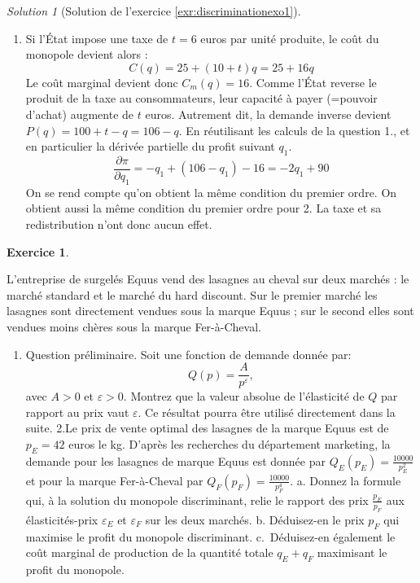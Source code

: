 \documentclass[
]{book}
\providecommand{\tightlist}{%
  \setlength{\itemsep}{0pt}\setlength{\parskip}{0pt}}
\theoremstyle{definition}
\theoremstyle{definition}
\theoremstyle{definition}
\newtheorem{exercise}{Exercice}[chapter]
\theoremstyle{definition}
\theoremstyle{remark}
\newtheorem*{solution}{Solution}
\begin{document}
\begin{solution}[Solution de l'exercice \ref{exr:discriminationexo1}]
\begin{enumerate}
\def\labelenumi{\arabic{enumi}.}
\setcounter{enumi}{2}
\tightlist
\item
  Si l'État impose une taxe de \(t=6\) euros par unité produite, le coût du monopole devient alors :
  \[C(q)=25+(10+t)q=25+16q\]
  Le coût marginal devient donc \(C_m(q)=16\).
  Comme l'État reverse le produit de la taxe au consommateurs, leur capacité à payer (=pouvoir d'achat) augmente de \(t\) euros.
  Autrement dit, la demande inverse devient \(P(q)=100+t-q=106-q\).
  En réutilisant les calculs de la question 1., et en particulier la dérivée partielle du profit suivant \(q_1\).
  \[\frac{\partial \pi}{\partial q_1}=-q_1+(106-q_1)-16=-2q_1+90\]
  On se rend compte qu'on obtient la même condition du premier ordre.
  On obtient aussi la même condition du premier ordre pour 2.
  La taxe et sa redistribution n'ont donc aucun effet.
\end{enumerate}

\end{solution}

\begin{exercise}
\protect\hypertarget{exr:discriminationexo2}{}\label{exr:discriminationexo2}

L'entreprise de surgelés Equus vend des lasagnes au cheval sur deux marchés : le marché standard et le marché du hard discount.
Sur le premier marché les lasagnes sont directement vendues sous la marque Equus ; sur le second elles sont vendues moins chères sous la marque Fer-à-Cheval.

\begin{enumerate}
\def\labelenumi{\arabic{enumi}.}
\tightlist
\item
  Question préliminaire.
  Soit une fonction de demande donnée par:
  \[Q(p)=\frac{A}{p^\varepsilon},\]
  avec \(A>0\) et \(\varepsilon >0\).
  Montrez que la valeur absolue de l'élasticité de \(Q\) par rapport au prix vaut \(\varepsilon\).
  Ce résultat pourra être utilisé directement dans la suite.
  2.Le prix de vente optimal des lasagnes de la marque Equus est de \(p_E=42\) euros le kg.
  D'après les recherches du département marketing, la demande pour les lasagnes de marque Equus est donnée par \(Q_E(p_E)=\frac{10000}{p_E^2}\) et pour la marque Fer-à-Cheval par \(Q_F(p_F)=\frac{10000}{p_F^4}\).
  a. Donnez la formule qui, à la solution du monopole discriminant, relie le rapport des prix \(\frac{p_E}{p_F}\) aux élasticités-prix \(\varepsilon_E\) et \(\varepsilon_F\) sur les deux marchés.
  b. Déduisez-en le prix \(p_F\) qui maximise le profit du monopole discriminant.
  c.~Déduisez-en également le coût marginal de production de la quantité totale \(q_E+q_F\) maximisant le profit du monopole.
\end{enumerate}

\end{exercise}
\end{document}

